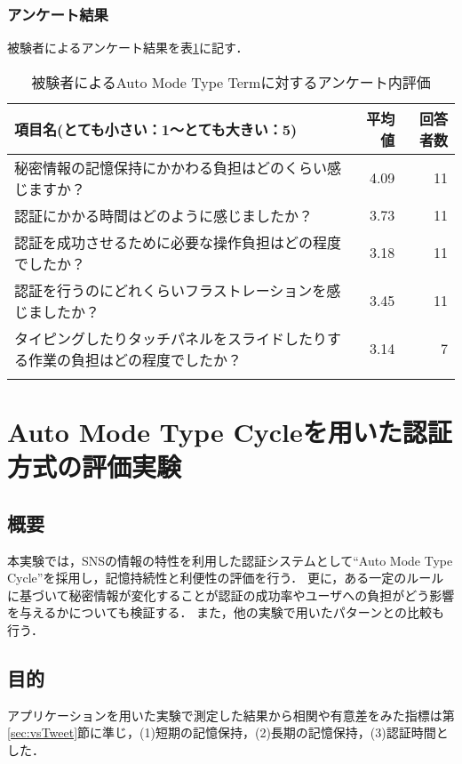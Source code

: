 \subsubsection{アンケート結果}
被験者によるアンケート結果を表\ref{tab:auto_term.enquete}に記す．
\begin{table}[ht]
  \caption{被験者によるAuto Mode Type Termに対するアンケート内評価}
  \label{tab:auto_term.enquete}
  \begin{center}
    \small
    \begin{tabular}{lrr}
      \bhline
      項目名(とても小さい：1〜とても大きい：5) & 平均値 & 回答者数 \\ \hline
      秘密情報の記憶保持にかかわる負担はどのくらい感じますか？ & 4.09 & 11 \\
      認証にかかる時間はどのように感じましたか？ & 3.73 & 11 \\
      認証を成功させるために必要な操作負担はどの程度でしたか？ & 3.18 & 11 \\
      認証を行うのにどれくらいフラストレーションを感じましたか？ & 3.45 & 11 \\
      タイピングしたりタッチパネルをスライドしたりする作業の負担はどの程度でしたか？ & 3.14 & 7 \\
      \bhline
    \end{tabular}
  \end{center}
\end{table}

\section{Auto Mode Type Cycleを用いた認証方式の評価実験}\label{sec:vsCycle}
\subsection{概要}
本実験では，SNSの情報の特性を利用した認証システムとして``Auto Mode Type Cycle''を採用し，記憶持続性と利便性の評価を行う．
更に，ある一定のルールに基づいて秘密情報が変化することが認証の成功率やユーザへの負担がどう影響を与えるかについても検証する．
また，他の実験で用いたパターンとの比較も行う．

\subsection{目的}
アプリケーションを用いた実験で測定した結果から相関や有意差をみた指標は第\ref{sec:vsTweet}節に準じ，(1)短期の記憶保持，(2)長期の記憶保持，(3)認証時間とした．

